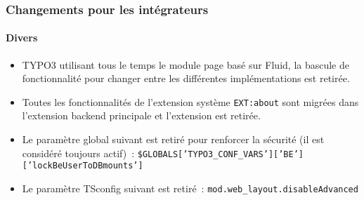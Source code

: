 %

\begin{frame}[fragile]
	\frametitle{Changements pour les intégrateurs}
	\framesubtitle{Divers}

	\begin{itemize}
		\item TYPO3 utilisant tous le temps le module page basé sur Fluid, la bascule
			de fonctionnalité pour changer entre les différentes implémentations est retirée.
		\item Toutes les fonctionnalités de l'extension système \texttt{EXT:about} sont
			migrées dans l'extension backend principale et l'extension est retirée.
		\item Le paramètre global suivant est retiré pour renforcer la sécurité
			(il est considéré toujours actif)~:\newline
			\smaller\texttt{\$GLOBALS['TYPO3\_CONF\_VARS']['BE']['lockBeUserToDBmounts']}\normalsize
		\item Le paramètre TSconfig suivant est retiré~:\newline
			\smaller\texttt{mod.web\_layout.disableAdvanced}\normalsize
	\end{itemize}

\end{frame}

